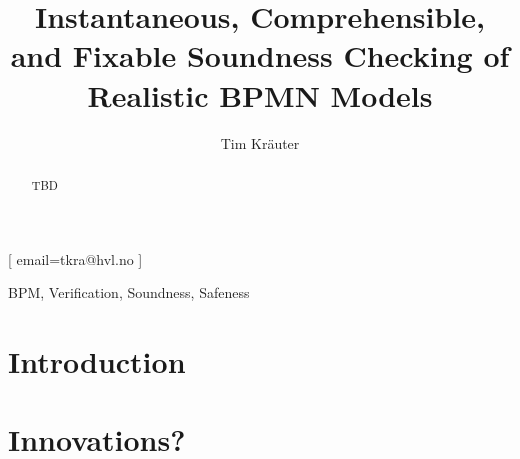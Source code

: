 \documentclass[
twocolumn,
]{ceurart}
\begin{document}


\title{Instantaneous, Comprehensible, and Fixable Soundness Checking of Realistic BPMN Models}

\author[1]{Tim Kräuter}[
email=tkra@hvl.no
]
\address[1]{Western Norway University of Applied Sciences, Bergen, Norway}

\begin{abstract}
  TBD
\end{abstract}

\begin{keywords}
BPM,
Verification,
Soundness,
Safeness
\end{keywords}

\maketitle


\section{Introduction}
\cite{krauterFormalizationAnalysisBPMN2023}


\section{Innovations?}




\end{document}
